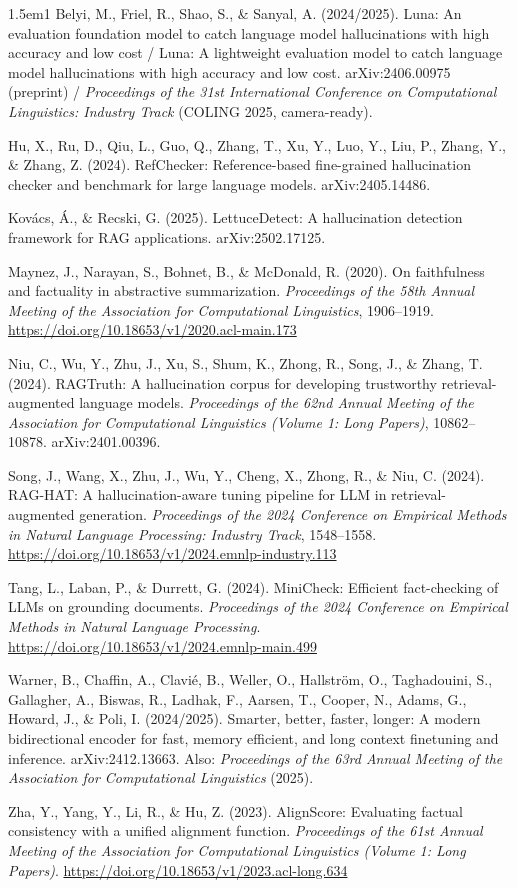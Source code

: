 \documentclass[11pt]{article}
\begin{document}
\begin{hangparas}{1.5em}{1}
Belyi, M., Friel, R., Shao, S., \& Sanyal, A. (2024/2025). Luna: An evaluation foundation
model to catch language model hallucinations with high accuracy and low cost / Luna: A
lightweight evaluation model to catch language model hallucinations with high accuracy and
low cost. arXiv:2406.00975 (preprint) / \emph{Proceedings of the 31st International Conference
on Computational Linguistics: Industry Track} (COLING 2025, camera-ready).

Hu, X., Ru, D., Qiu, L., Guo, Q., Zhang, T., Xu, Y., Luo, Y., Liu, P., Zhang, Y., \& Zhang,
Z. (2024). RefChecker: Reference-based fine-grained hallucination checker and benchmark
for large language models. arXiv:2405.14486.

Kovács, Á., \& Recski, G. (2025). LettuceDetect: A hallucination detection framework for
RAG applications. arXiv:2502.17125.

Maynez, J., Narayan, S., Bohnet, B., \& McDonald, R. (2020). On faithfulness and factuality
in abstractive summarization. \emph{Proceedings of the 58th Annual Meeting of the Association
for Computational Linguistics}, 1906--1919. \url{https://doi.org/10.18653/v1/2020.acl-main.173}

Niu, C., Wu, Y., Zhu, J., Xu, S., Shum, K., Zhong, R., Song, J., \& Zhang, T. (2024).
RAGTruth: A hallucination corpus for developing trustworthy retrieval-augmented language
models. \emph{Proceedings of the 62nd Annual Meeting of the Association for Computational
Linguistics (Volume 1: Long Papers)}, 10862--10878. arXiv:2401.00396.

Song, J., Wang, X., Zhu, J., Wu, Y., Cheng, X., Zhong, R., \& Niu, C. (2024). RAG-HAT: A
hallucination-aware tuning pipeline for LLM in retrieval-augmented generation.
\emph{Proceedings of the 2024 Conference on Empirical Methods in Natural Language Processing:
Industry Track}, 1548--1558. \url{https://doi.org/10.18653/v1/2024.emnlp-industry.113}

Tang, L., Laban, P., \& Durrett, G. (2024). MiniCheck: Efficient fact-checking of LLMs on
grounding documents. \emph{Proceedings of the 2024 Conference on Empirical Methods in Natural
Language Processing}. \url{https://doi.org/10.18653/v1/2024.emnlp-main.499}

Warner, B., Chaffin, A., Clavié, B., Weller, O., Hallström, O., Taghadouini, S., Gallagher,
A., Biswas, R., Ladhak, F., Aarsen, T., Cooper, N., Adams, G., Howard, J., \& Poli, I.
(2024/2025). Smarter, better, faster, longer: A modern bidirectional encoder for fast,
memory efficient, and long context finetuning and inference. arXiv:2412.13663. Also:
\emph{Proceedings of the 63rd Annual Meeting of the Association for Computational Linguistics}
(2025).

Zha, Y., Yang, Y., Li, R., \& Hu, Z. (2023). AlignScore: Evaluating factual consistency with
a unified alignment function. \emph{Proceedings of the 61st Annual Meeting of the Association
for Computational Linguistics (Volume 1: Long Papers)}.
\url{https://doi.org/10.18653/v1/2023.acl-long.634}
\end{hangparas}
\end{document}

